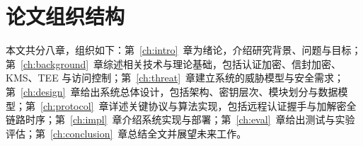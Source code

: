 \section{论文组织结构}

本文共分八章，组织如下：第~\ref{ch:intro}~章为绪论，介绍研究背景、问题与目标；第~\ref{ch:background}~章综述相关技术与理论基础，包括认证加密、信封加密、KMS、TEE 与访问控制；第~\ref{ch:threat}~章建立系统的威胁模型与安全需求；第~\ref{ch:design}~章给出系统总体设计，包括架构、密钥层次、模块划分与数据模型；第~\ref{ch:protocol}~章详述关键协议与算法实现，包括远程认证握手与加解密全链路时序；第~\ref{ch:impl}~章介绍系统实现与部署；第~\ref{ch:eval}~章给出测试与实验评估；第~\ref{ch:conclusion}~章总结全文并展望未来工作。
